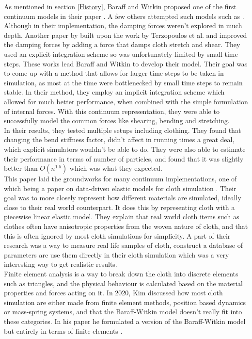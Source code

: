 \documentclass[12pt,a4paper]{article}
\begin{document}
As mentioned in section \ref{History}, Baraff and Witkin proposed one of the first continuum models in their paper \cite{Baraff1998largesteps}. A few others attempted such models such as \cite{terzopoulos1987elastically}. Although in their implementation, the damping forces weren't explored in much depth. Another paper by \cite{carignanclothy} built upon the work by Terzopoulos et al. and improved the damping forces by adding a force that damps cloth stretch and shear. They used an explicit integration scheme so was unfortunately limited by small time steps. These works lead Baraff and Witkin to develop their model. Their goal was to come up with a method that allows for larger time steps to be taken in simulation, as most at the time were bottlenecked by small time steps to remain stable. In their method, they employ an implicit integration scheme which allowed for much better performance, when combined with the simple formulation of internal forces. With this continuum representation, they were able to successfully model the common forces like shearing, bending and stretching. \\ 

In their results, they tested multiple setups including clothing. They found that changing the bend stiffness factor, didn't affect in running times a great deal, which explicit simulators wouldn't be able to do. They were also able to estimate their performance in terms of number of particles, and found that it was slightly better than \(O(n^{1.5})\) which was what they expected.\\

This paper laid the groundworks for many continuum implementations, one of which being a paper on data-driven elastic models for cloth simulation \cite{wangdatadriven}. Their goal was to more closely represent how different materials are simulated, ideally close to their real world counterpart. It does this by representing cloth with a piecewise linear elastic model. They explain that real world cloth items such as clothes often have anisotropic properties from the woven nature of cloth, and that this is often ignored by most cloth simulations for simplicity. A part of their research was a way to measure real life samples of cloth, construct a database of parameters are use them directly in their cloth simulation which was a very interesting way to get realistic results.
\\

Finite element analysis is a way to break down the cloth into discrete elements such as triangles, and the physical behaviour is calculated based on the material properties and forces acting on it. In 2020, Kim discussed how most cloth simulation are either made from finite element methods, position based dynamics or mass-spring systems, and that the Baraff-Witkin model doesn't really fit into these categories. In his paper he formulated a version of the Baraff-Witkin model but entirely in terms of finite elements \cite{FEMcantunderstand}. \\ 
\end{document}
